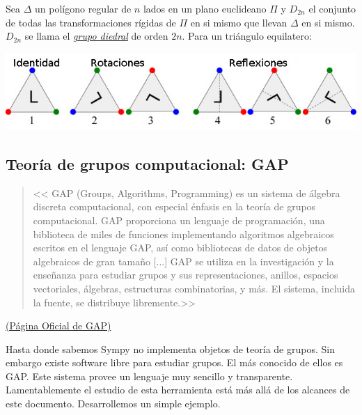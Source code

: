 \begin{ejemplo} Sea $\Delta$ un polígono regular de $n$ lados  en un plano euclideano $\Pi$ y $D_{2n}$ el conjunto de todas las transformaciones rígidas de $\Pi$ en si mismo que llevan $\Delta$ en si mismo. $D_{2n}$ se llama el \href{http://es.wikipedia.org/wiki/Grupo_diedral}{\emph{grupo diedral}}  de orden $2n$. Para un triángulo equilatero:
\begin{center}
\includegraphics[scale=.4]{imagenes/SimTria.jpg}
\end{center}
\end{ejemplo}



\subsection{Teoría de grupos computacional: GAP}


\begin{quote}
 << 
GAP (Groups, Algorithms, Programming) es un sistema de álgebra discreta computacional, con especial énfasis en la teoría de grupos computacional. GAP proporciona un lenguaje de programación, una biblioteca de miles de funciones implementando algoritmos algebraicos escritos en el lenguaje GAP, así como bibliotecas de datos de objetos algebraicos de gran tamaño [...] GAP se utiliza en la investigación y la enseñanza para estudiar grupos y sus representaciones, anillos, espacios vectoriales, álgebras, estructuras combinatorias, y más. El sistema, incluida la fuente, se distribuye libremente.>>
\end{quote}
\begin{flushright}
 \href{https://www.gap-system.org/}{(Página Oficial de GAP)}
\end{flushright}

Hasta donde sabemos Sympy no implementa objetos de teoría de grupos. Sin embargo existe software libre para estudiar grupos. El más conocido de ellos es GAP. Este sistema provee un lenguaje muy sencillo y transparente. Lamentablemente el estudio de esta herramienta está más allá de los alcances de este documento. Desarrollemos un simple ejemplo.

